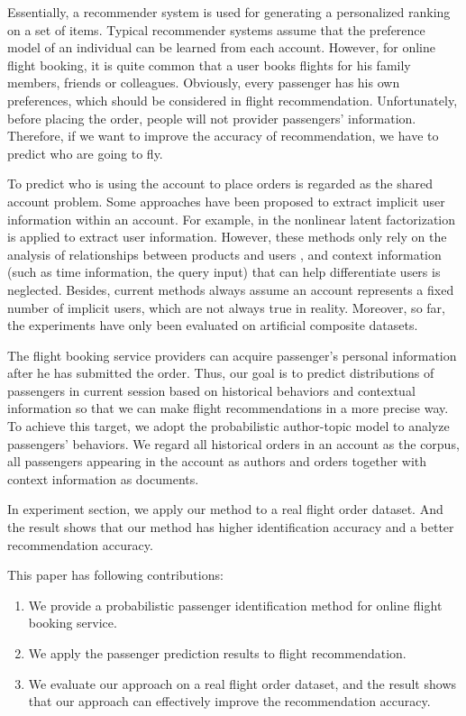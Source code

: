 \documentclass{llncs}
\begin{document}
\par Essentially, a recommender system is used for generating a personalized ranking on a set of items\cite{lv:rec}. Typical recommender systems assume that the preference model of an individual can be learned from each account. However, for online flight booking, it is quite common that a user books flights for his family members, friends or colleagues.  Obviously, every passenger has his own preferences, which should be considered in flight recommendation. Unfortunately, before placing the order, people will not provider passengers' information.  Therefore, if we want to improve the accuracy of recommendation, we have to predict who are going to fly.  \par
To predict who is using the account to place orders is regarded as the shared account problem. Some approaches have been proposed to extract implicit user information within an account. For example,  in \cite{kabbur:nlmf}\cite{jason:embedding} the nonlinear latent factorization is applied to  extract user information. However, these methods only rely on the analysis of relationships between products and users \cite{koen:top-n}\cite{yutaka:modeling}, and context information (such as time information, the query input) that can help differentiate users is neglected. Besides, current methods always assume an account represents a fixed number of implicit users, which are not always true in reality. Moreover, so far, the experiments have only been evaluated on artificial composite datasets. \par
The flight booking service providers can acquire passenger's personal information after he has submitted the order. Thus, our goal is to predict distributions of passengers in current session based on historical behaviors and contextual information so that we can make flight recommendations in a more precise way. To achieve this target, we adopt the probabilistic author-topic model to analyze passengers' behaviors. We regard all historical orders in an account as the corpus, all passengers appearing in the account as authors and orders together with context information as documents.\par
In experiment section, we apply our method to a real flight order dataset. And the result shows that our method has higher identification accuracy and a better recommendation accuracy.\par
This paper has following contributions:\\
\begin{enumerate}
\item We provide a probabilistic passenger identification method for online flight booking service.
\item We apply the passenger prediction results to flight recommendation.
\item We evaluate our approach on a real flight order dataset, and the result shows that our approach can effectively improve the recommendation accuracy.
\end{enumerate}
\end{document}
